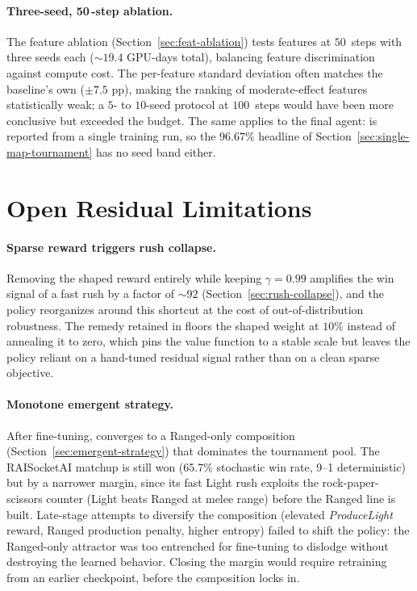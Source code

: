 \paragraph*{Three-seed, 50\,-step ablation.}
The feature ablation (Section~\ref{sec:feat-ablation}) tests features at $50$\, steps with three seeds each (${\sim}19.4$ GPU-days total), balancing feature discrimination against compute cost. The per-feature standard deviation often matches the baseline's own ($\pm 7.5$ pp), making the ranking of moderate-effect features statistically weak; a $5$- to $10$-seed protocol at $100$\, steps would have been more conclusive but exceeded the budget. The same applies to the final agent:  is reported from a single training run, so the $96.67$\% headline of Section~\ref{sec:single-map-tournament} has no seed band either.

\section{Open Residual Limitations}
\label{sec:lim-open}

\paragraph*{Sparse reward triggers rush collapse.}
Removing the shaped reward entirely while keeping $\gamma=0.99$ amplifies the win signal of a fast rush by a factor of ${\sim}92$ (Section~\ref{sec:rush-collapse}), and the policy reorganizes around this shortcut at the cost of out-of-distribution robustness. The remedy retained in  floors the shaped weight at $10$\% instead of annealing it to zero, which pins the value function to a stable scale but leaves the policy reliant on a hand-tuned residual signal rather than on a clean sparse objective.

\paragraph*{Monotone emergent strategy.}
After fine-tuning,  converges to a Ranged-only composition (Section~\ref{sec:emergent-strategy}) that dominates the tournament pool. The RAISocketAI matchup is still won (65.7\% stochastic win rate, 9--1 deterministic) but by a narrower margin, since its fast Light rush exploits the rock-paper-scissors counter (Light beats Ranged at melee range) before the Ranged line is built. Late-stage attempts to diversify the composition (elevated \emph{ProduceLight} reward, Ranged production penalty, higher entropy) failed to shift the policy: the Ranged-only attractor was too entrenched for fine-tuning to dislodge without destroying the learned behavior. Closing the margin would require retraining from an earlier checkpoint, before the composition locks in.

